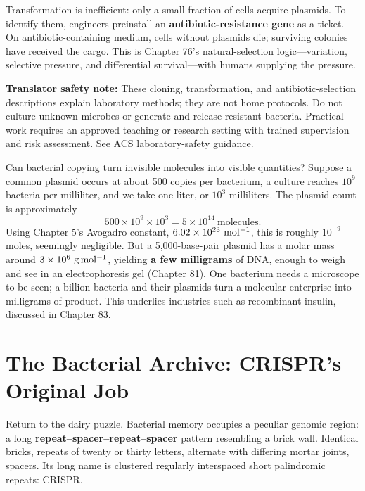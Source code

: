 Transformation is inefficient: only a small fraction of cells acquire plasmids. To identify them, engineers preinstall an \textbf{antibiotic-resistance gene} as a ticket. On antibiotic-containing medium, cells without plasmids die; surviving colonies have received the cargo. This is Chapter 76's natural-selection logic---variation, selective pressure, and differential survival---with humans supplying the pressure.

\textbf{Translator safety note:} These cloning, transformation, and antibiotic-selection descriptions explain laboratory methods; they are not home protocols. Do not culture unknown microbes or generate and release resistant bacteria. Practical work requires an approved teaching or research setting with trained supervision and risk assessment. See \href{https://institute.acs.org/acs-center/lab-safety/education-training/safer-experiments.html}{ACS laboratory-safety guidance}.

\begin{qiaoliang}
Can bacterial copying turn invisible molecules into visible quantities? Suppose a common plasmid occurs at about 500 copies per bacterium, a culture reaches $10^{9}$ bacteria per milliliter, and we take one liter, or $10^{3}$ milliliters. The plasmid count is approximately
\[500 \times 10^{9} \times 10^{3} = 5\times 10^{14}\ \text{molecules}.\]
Using Chapter 5's Avogadro constant, $6.02\times 10^{23}\ \mathrm{mol^{-1}}$, this is roughly $10^{-9}$ moles, seemingly negligible. But a 5,000-base-pair plasmid has a molar mass around $3\times 10^{6}\ \mathrm{g\,mol^{-1}}$, yielding \textbf{a few milligrams} of DNA, enough to weigh and see in an electrophoresis gel (Chapter 81). One bacterium needs a microscope to be seen; a billion bacteria and their plasmids turn a molecular enterprise into milligrams of product. This underlies industries such as recombinant insulin, discussed in Chapter 83.
\end{qiaoliang}

\section{The Bacterial Archive: CRISPR's Original Job}

Return to the dairy puzzle. Bacterial memory occupies a peculiar genomic region: a long \textbf{repeat--spacer--repeat--spacer} pattern resembling a brick wall. Identical bricks, repeats of twenty or thirty letters, alternate with differing mortar joints, spacers. Its long name is clustered regularly interspaced short palindromic repeats: CRISPR.

